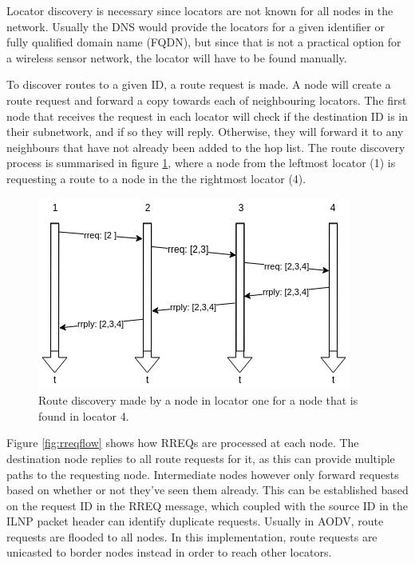 \documentclass[12pt]{article}
\begin{document}
Locator discovery is necessary since locators are not known for all nodes in the network. Usually the DNS would provide the locators for a given identifier or fully qualified domain name (FQDN), but since that is not a practical option for a wireless sensor network, the locator will have to be found manually. 

To discover routes to a given ID, a route request is made. A node will create a route request and forward a copy towards each of neighbouring locators. The first node that receives the request in each locator will check if the destination ID is in their subnetwork, and if so they will reply. Otherwise, they will forward it to any neighbours that have not already been added to the hop list. The route discovery process is summarised in figure \ref{fig:path}, where a node from the leftmost locator (1) is requesting a route to a node in the the rightmost locator (4).

\begin{figure}[!ht]
	\centering
	\includegraphics[width=\linewidth]{images/path}
	\caption{Route discovery made by a node in locator one for a node that is found in locator 4.}
	\label{fig:path}
\end{figure}

Figure \ref{fig:rreqflow} shows how RREQs are processed at each node. The destination node replies to all route requests for it, as this can provide multiple paths to the requesting node. Intermediate nodes however only forward requests based on whether or not they've seen them already. This can be established based on the request ID in the RREQ message, which coupled with the source ID in the ILNP packet header can identify duplicate requests. Usually in AODV, route requests are flooded to all nodes. In this implementation, route requests are unicasted to border nodes instead in order to reach other locators. 
\end{document}
